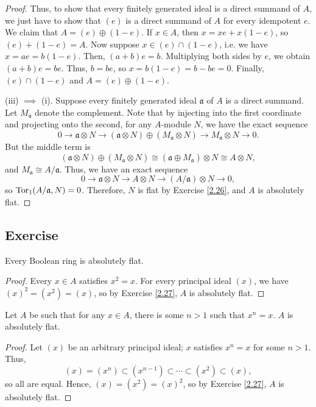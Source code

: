 \begin{proof}
Thus, to show that every finitely generated ideal is a direct summand of $A$, we just have to show that $(e)$ is a direct summand of $A$ for every idempotent $e$. We claim that $A = (e)\oplus(1-e)$.
If $x \in A$, then $x = xe + x(1-e)$, so $(e) + (1-e) = A$. Now suppose $x \in (e) \cap (1-e)$, i.e. we have $x = ae = b(1-e)$. Then, $(a+b)e = b$. Multiplying both sides by $e$, we obtain $(a+b)e = be$. 
Thus, $b = be$, so $x = b(1-e) = b - be = 0$. Finally, $(e) \cap (1-e)$ and $A = (e) \oplus (1-e)$.

(iii) $\implies$ (i). Suppose every finitely generated ideal $\mathfrak{a}$ of $A$ is a direct summand. Let $M_{\mathfrak{a}}$ denote the complement.
Note that by injecting into the first coordinate and projecting onto the second, for any $A$-module $N$, we have the exact sequence
$$0 \to \mathfrak{a} \otimes N \to (\mathfrak{a} \otimes N) \oplus (M_{\mathfrak{a}} \otimes N) \to M_{\mathfrak{a}} \otimes N \to 0.$$
But the middle term is
$$(\mathfrak{a} \otimes N) \oplus (M_{\mathfrak{a}} \otimes N) \cong (\mathfrak{a} \oplus M_{\mathfrak{a}}) \otimes N \cong A \otimes N,$$
and $M_{\mathfrak{a}} \cong A/\mathfrak{a}$. Thus, we have an exact sequence
$$0 \to \mathfrak{a} \otimes N \to A \otimes N \to (A/\mathfrak{a}) \otimes N \to 0,$$
so $\operatorname{Tor}_1(A/\mathfrak{a},N) = 0$. Therefore, $N$ is flat by Exercise \ref{2.26}, and $A$ is absolutely flat.
\end{proof}

\subsection{Exercise}\label{2.28} %

Every Boolean ring is absolutely flat.

\begin{proof}
Every $x \in A$ satisfies $x^2 = x$. For every principal ideal $(x)$, we have $(x)^2 = (x^2) = (x)$, so by Exercise \ref{2.27}, $A$ is absolutely flat.
\end{proof}

Let $A$ be such that for any $x \in A$, there is some $n > 1$ such that $x^n = x$. $A$ is absolutely flat.

\begin{proof}
Let $(x)$ be an arbitrary principal ideal; $x$ satisfies $x^n = x$ for some $n > 1$. Thus,
$$(x) = (x^n) \subset (x^{n-1}) \subset \cdots \subset (x^2) \subset (x),$$
so all are equal. Hence, $(x) = (x^2) = (x)^2$, so by Exercise \ref{2.27}, $A$ is absolutely flat.
\end{proof}

